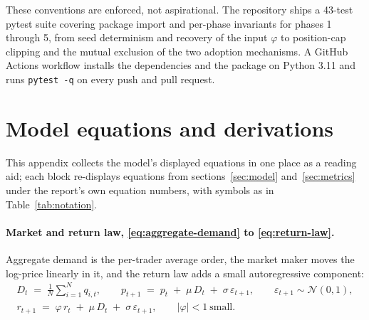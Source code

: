 \documentclass[12pt]{article}
\begin{document}
These conventions are enforced, not aspirational. The repository ships a 43-test pytest suite covering package import and per-phase invariants for phases 1 through 5, from seed determinism and recovery of the input $\varphi$ to position-cap clipping and the mutual exclusion of the two adoption mechanisms. %
A GitHub Actions workflow installs the dependencies and the package on Python 3.11 and runs \texttt{pytest -q} on every push and pull request. %

\section{Model equations and derivations}\label{app:equations}

This appendix collects the model's displayed equations in one place as a reading aid; each block re-displays equations from sections~\ref{sec:model} and~\ref{sec:metrics} under the report's own equation numbers, with symbols as in Table~\ref{tab:notation}.

\paragraph{Market and return law, \eqref{eq:aggregate-demand} to \eqref{eq:return-law}.}
Aggregate demand is the per-trader average order, the market maker moves the log-price linearly in it, and the return law adds a small autoregressive component:
\begin{gather*}
  D_t \;=\; \frac{1}{N} \sum_{i=1}^{N} q_{i,t}, \qquad
  p_{t+1} \;=\; p_t \;+\; \mu\, D_t \;+\; \sigma\, \varepsilon_{t+1}, \qquad \varepsilon_{t+1} \sim \mathcal{N}(0, 1),\\
  r_{t+1} \;=\; \varphi\, r_t \;+\; \mu\, D_t \;+\; \sigma\, \varepsilon_{t+1}, \qquad |\varphi| < 1\ \text{small.}
\end{gather*}
\end{document}
